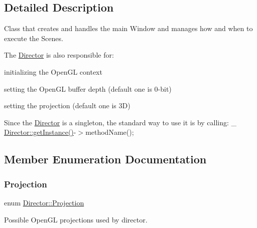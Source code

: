 \subsection{Detailed Description}
Class that creates and handles the main Window and manages how and when to execute the Scenes. 

The \hyperlink{classDirector}{Director} is also responsible for\+:
\begin{DoxyItemize}
\item initializing the Open\+GL context
\item setting the Open\+GL buffer depth (default one is 0-\/bit)
\item setting the projection (default one is 3D)
\end{DoxyItemize}

Since the \hyperlink{classDirector}{Director} is a singleton, the standard way to use it is by calling\+: \+\_\+ \hyperlink{classDirector_a8d2a4ca9e20cd400ddadd516efa111e0}{Director\+::get\+Instance()}-\/$>$method\+Name(); 

\subsection{Member Enumeration Documentation}
\mbox{\label{classDirector_aaa3d9a0eac7c805d87ecba67c974fcf2}} 
\subsubsection{\texorpdfstring{Projection}{Projection}\hspace{0.1cm}{\footnotesize\ttfamily [1/2]}}
{\footnotesize\ttfamily enum \hyperlink{classDirector_aaa3d9a0eac7c805d87ecba67c974fcf2}{Director\+::\+Projection}\hspace{0.3cm}{\ttfamily [strong]}}



Possible Open\+GL projections used by director. 


